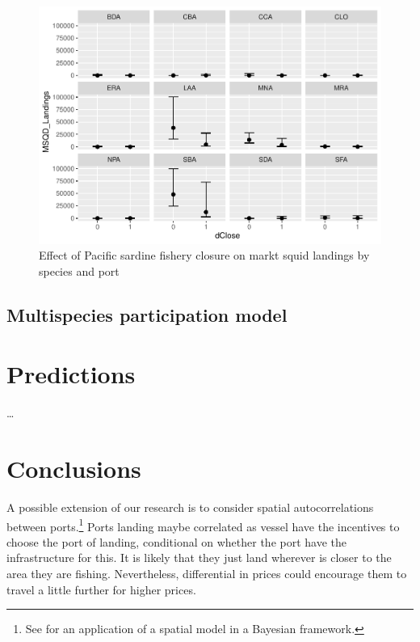 \documentclass[
]{article}
\begin{document}
\begin{figure}
\centering
\includegraphics{econ_landings_paper_files/figure-latex/by_port_msqd_dclose-1.pdf}
\caption{Effect of Pacific sardine fishery closure on markt squid
landings by species and port\label{fig:sdmeffects}}
\end{figure}

\hypertarget{multispecies-participation-model-1}{%
\subsection{Multispecies participation
model}\label{multispecies-participation-model-1}}

\hypertarget{predictions}{%
\section{Predictions}\label{predictions}}

\ldots{}

\hypertarget{conclusions}{%
\section{Conclusions}\label{conclusions}}

A possible extension of our research is to consider spatial
autocorrelations between ports.\footnote{See \cite{morris2019bayesian}
  for an application of a spatial model in a Bayesian framework.} Ports
landing maybe correlated as vessel have the incentives to choose the
port of landing, conditional on whether the port have the infrastructure
for this. It is likely that they just land wherever is closer to the
area they are fishing. Nevertheless, differential in prices could
encourage them to travel a little further for higher prices.

  
\end{document}
